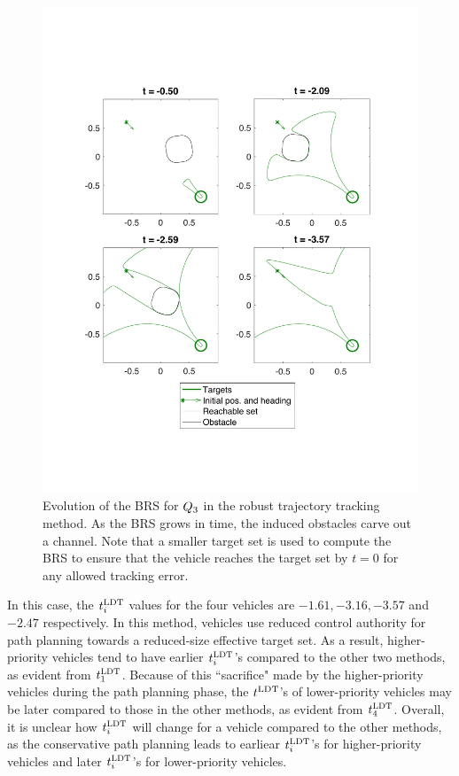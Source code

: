\begin{figure}
  \centering
  \includegraphics[width=\columnwidth]{"fig/rtt_rs3"}
  \caption{Evolution of the BRS for $Q_3$ in the robust trajectory tracking method. As the BRS grows in time, the induced obstacles carve out a channel. Note that a smaller target set is used to compute the BRS to ensure that the vehicle reaches the target set by $t=0$ for any allowed tracking error.}
  \label{fig:rtt_rs3}
\end{figure}

In this case, the $t^\text{LDT}_i$ values for the four vehicles are $-1.61, -3.16, -3.57$ and $-2.47$ respectively. In this method, vehicles use reduced control authority for path planning towards a reduced-size effective target set. As a result, higher-priority vehicles tend to have earlier $t^\text{LDT}_i$'s compared to the other two methods, as evident from $t^\text{LDT}_1$. Because of this ``sacrifice" made by the higher-priority vehicles during the path planning phase, the $t^\text{LDT}$'s of lower-priority vehicles may be later compared to those in the other methods, as evident from $t^\text{LDT}_4$. Overall, it is unclear how $t^\text{LDT}_i$ will change for a vehicle compared to the other methods, as the conservative path planning leads to earliear $t^\text{LDT}_i$'s for higher-priority vehicles and later $t^\text{LDT}_i$'s for lower-priority vehicles.
